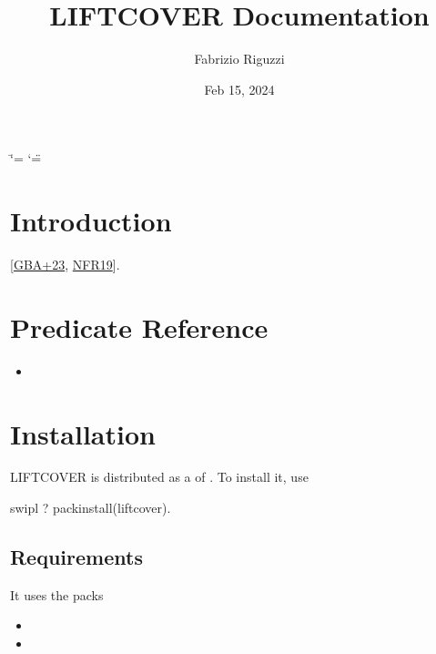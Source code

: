 \documentclass[letterpaper,10pt,english]{sphinxmanual}
\title{LIFTCOVER Documentation}
\date{Feb 15, 2024}
\author{Fabrizio Riguzzi}
\begin{document}
\ifdefined\shorthandoff
  \ifnum\catcode`\=\string=\active\shorthandoff{=}\fi
  \ifnum\catcode`\"=\active{}\fi
\fi

\pagestyle{empty}
\sphinxmaketitle
\pagestyle{plain}
\sphinxtableofcontents
\pagestyle{normal}
\label{\detokenize{index::doc}}



\chapter{Introduction}
\label{\detokenize{index:introduction}}\begin{description}
\sphinxAtStartPar
{[}\hyperlink{cite.index:id7}{GBA+23}, \hyperlink{cite.index:id34}{NFR19}{]}.

\end{description}


\chapter{Predicate Reference}
\label{\detokenize{index:predicate-reference}}\begin{itemize}
\item {} 
\sphinxAtStartPar
{}

\end{itemize}


\chapter{Installation}
\label{\detokenize{index:installation}}
\sphinxAtStartPar
LIFTCOVER is distributed as a  of .
To install it, use

\begin{sphinxVerbatim}[commandchars=\\\{\}]
\PYGZdl{} swipl
?\PYGZhy{} pack\PYGZus{}install(liftcover).
\end{sphinxVerbatim}


\section{Requirements}
\label{\detokenize{index:requirements}}
\sphinxAtStartPar
It uses the packs
\begin{itemize}
\item {} 
\sphinxAtStartPar
{}

\item {} 
\sphinxAtStartPar
{}

\end{itemize}
\end{document}
